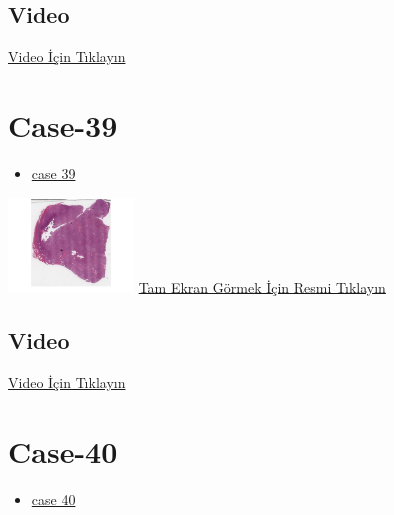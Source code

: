\documentclass[
  letterpaper,
  DIV=11,
  numbers=noendperiod]{scrreprt}
\providecommand{\tightlist}{%
  \setlength{\itemsep}{0pt}\setlength{\parskip}{0pt}}\usepackage{longtable,booktabs,array}
\begin{document}
\hypertarget{video-36}{%
\subsection{Video}\label{video-36}}

\href{https://www.youtube.com/watch?v=hhO5QsqIPFg}{Video İçin Tıklayın}

\hypertarget{sec-hacettepe-case-of-the-month-case-39}{%
\section{Case-39}\label{sec-hacettepe-case-of-the-month-case-39}}

\begin{itemize}
\tightlist
\item
  \href{https://www.youtube.com/watch?v=q4nuIBROlZI\&ab_channel=KemalKosemehmetoglu}{case
  39}
\end{itemize}

\href{https://images.patolojiatlasi.com/hacettepe-com-case-39/HE.html}{\includegraphics[width=0.25\textwidth,height=\textheight]{./screenshots/thumbnail_hacettepe-com-case-39.png}}
\href{https://images.patolojiatlasi.com/hacettepe-com-case-39/HE.html}{Tam
Ekran Görmek İçin Resmi Tıklayın}

\hypertarget{video-37}{%
\subsection{Video}\label{video-37}}

\href{https://www.youtube.com/watch?v=q4nuIBROlZI}{Video İçin Tıklayın}

\hypertarget{sec-hacettepe-case-of-the-month-case-}{%
\section{Case-40}\label{sec-hacettepe-case-of-the-month-case-}}

\begin{itemize}
\tightlist
\item
  \href{https://www.youtube.com/watch?v=In97sPfT9w4\&ab_channel=KemalKosemehmetoglu}{case
  40}
\end{itemize}
\end{document}
